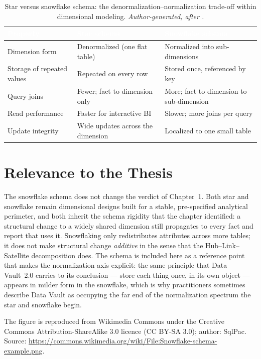 \begin{table}[H]
\centering
\renewcommand{\arraystretch}{1.35}
\caption{Star versus snowflake schema: the denormalization--normalization trade-off within dimensional modeling. \textit{Author-generated, after \parencite{kimball2013}.}}
\label{tab:app-star-snowflake}
\begin{tabularx}{\linewidth}{|>{\raggedright\arraybackslash}p{3.4cm}|>{\raggedright\arraybackslash}X|>{\raggedright\arraybackslash}X|}
\hline
\rowcolor{tblheader}
\textcolor{white}{\textbf{Property}} &
\textcolor{white}{\textbf{Star schema}} &
\textcolor{white}{\textbf{Snowflake schema}} \\
\hline
Dimension form & Denormalized (one flat table) & Normalized into sub-dimensions \\
Storage of repeated values & Repeated on every row & Stored once, referenced by key \\
Query joins & Fewer; fact to dimension only & More; fact to dimension to sub-dimension \\
Read performance & Faster for interactive BI & Slower; more joins per query \\
Update integrity & Wide updates across the dimension & Localized to one small table \\
\hline
\end{tabularx}
\end{table}

\section*{Relevance to the Thesis}

The snowflake schema does not change the verdict of Chapter~1. Both star and snowflake remain dimensional designs built for a stable, pre-specified analytical perimeter, and both inherit the schema rigidity that the chapter identified: a structural change to a widely shared dimension still propagates to every fact and report that uses it. Snowflaking only redistributes attributes across more tables; it does not make structural change \emph{additive} in the sense that the Hub--Link--Satellite decomposition does. The schema is included here as a reference point that makes the normalization axis explicit: the same principle that Data Vault~2.0 carries to its conclusion --- store each thing once, in its own object --- appears in milder form in the snowflake, which is why practitioners sometimes describe Data Vault as occupying the far end of the normalization spectrum the star and snowflake begin.

\medskip
\noindent\footnotesize The figure is reproduced from Wikimedia Commons under the Creative Commons Attribution-ShareAlike 3.0 licence (CC BY-SA 3.0); author: SqlPac. Source: \url{https://commons.wikimedia.org/wiki/File:Snowflake-schema-example.png}.
